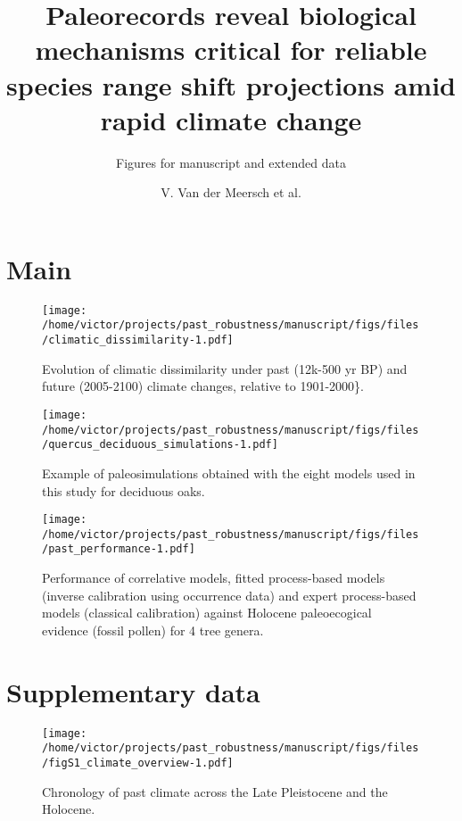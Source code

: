 \documentclass[
]{article}
\title{Paleorecords reveal biological mechanisms critical for reliable
species range shift projections amid rapid climate change}
\subtitle{Figures for manuscript and extended data}
\author{V. Van der Meersch et al.}
\date{}
\begin{document}
\maketitle

\section{Main}\label{main}

\begin{figure}
\centering
\texttt{[image: /home/victor/projects/past\_robustness/manuscript/figs/files/climatic\_dissimilarity-1.pdf]}
\caption{Evolution of climatic dissimilarity under past (12k-500 yr BP)
and future (2005-2100) climate changes, relative to 1901-2000\}.}
\end{figure}

\newpage

\begin{figure}
\centering
\texttt{[image: /home/victor/projects/past\_robustness/manuscript/figs/files/quercus\_deciduous\_simulations-1.pdf]}
\caption{Example of paleosimulations obtained with the eight models used
in this study for deciduous oaks.}
\end{figure}

\newpage

\begin{figure}
\centering
\texttt{[image: /home/victor/projects/past\_robustness/manuscript/figs/files/past\_performance-1.pdf]}
\caption{Performance of correlative models, fitted process-based models
(inverse calibration using occurrence data) and expert process-based
models (classical calibration) against Holocene paleoecogical evidence
(fossil pollen) for 4 tree genera.}
\end{figure}

\newpage

\section{Supplementary data}\label{supplementary-data}

\renewcommand{\thefigure}{S\arabic{figure}}
\setcounter{figure}{0}

\begin{figure}
\centering
\texttt{[image: /home/victor/projects/past\_robustness/manuscript/figs/files/figS1\_climate\_overview-1.pdf]}
\caption{Chronology of past climate across the Late Pleistocene and the
Holocene.}
\end{figure}
\end{document}
